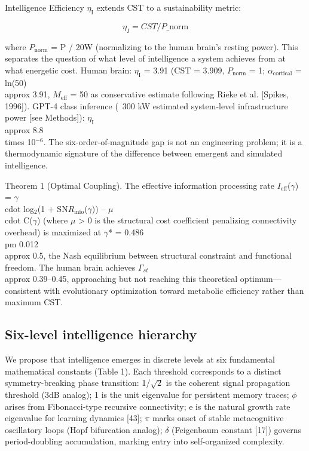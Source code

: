 \documentclass[a4paper,12pt]{article}
\begin{document}
Intelligence Efficiency $\eta_{\text{I}}$ extends CST to a sustainability metric:


\begin{equation}
\eta_I = CST / P\_{\text{norm}} \tag{5}
\end{equation}


where $P_{\text{norm}}$ = P / 20W (normalizing to the human brain's resting power). This separates the question of what level of intelligence a system achieves from at what energetic cost. Human brain: $\eta_{\text{I}}$ = 3.91 (CST = 3.909, $P_{\text{norm}}$ = 1; $\alpha_{\text{cortical}}$ = ln(50)  \\approx  3.91, $M_{\text{eff}}$ = 50 as conservative estimate following Rieke et al. [Spikes, 1996]). GPT-4 class inference (~300 kW estimated system-level infrastructure power [see Methods]): $\eta_{\text{I}}$  \\approx  8.8 \\times 10$^{-6}$. The six-order-of-magnitude gap is not an engineering problem; it is a thermodynamic signature of the difference between emergent and simulated intelligence.


Theorem 1 (Optimal Coupling). The effective information processing rate $I_{\text{eff}}$($\gamma$) = $\gamma$  \\cdot  log$_2$(1 + SN$R_{\text{info}}$($\gamma$)) -- $\mu$  \\cdot  C($\gamma$) (where $\mu$ > 0 is the structural cost coefficient penalizing connectivity overhead) is maximized at $\gamma$* = 0.486  \\pm  0.012  \\approx  0.5, the Nash equilibrium between structural constraint and functional freedom. The human brain achieves $\Gamma_{st}$  \\approx  0.39--0.45, approaching but not reaching this theoretical optimum---consistent with evolutionary optimization toward metabolic efficiency rather than maximum CST.



\subsection{Six-level intelligence hierarchy}

We propose that intelligence emerges in discrete levels at six fundamental mathematical constants (Table 1). Each threshold corresponds to a distinct symmetry-breaking phase transition: 1/$\sqrt{2}$ is the coherent signal propagation threshold (3dB analog); 1 is the unit eigenvalue for persistent memory traces; $\phi$ arises from Fibonacci-type recursive connectivity; e is the natural growth rate eigenvalue for learning dynamics [43]; $\pi$ marks onset of stable metacognitive oscillatory loops (Hopf bifurcation analog); $\delta$ (Feigenbaum constant [17]) governs period-doubling accumulation, marking entry into self-organized complexity.
\end{document}
